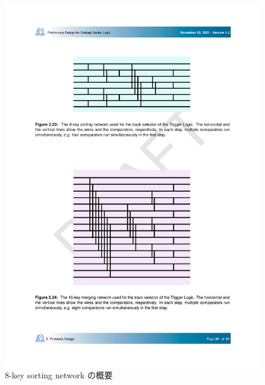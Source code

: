 \begin{figure} 
\centering
\includegraphics[width=16cm]{fig/SL/Sortiing_8key.pdf}
\caption[8-key sorting network の概要]{8-key sorting network の概要}
\label{Sortiing_8key}
\end{figure}

